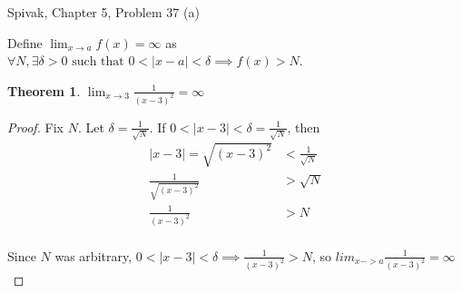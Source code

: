 \documentclass{article} %
\theoremstyle{plain}
\newtheorem*{theorem*}{Theorem}
\theoremstyle{definition}
\begin{document}
\noindent{} Spivak, Chapter 5, Problem 37 (a) 

Define $\lim_{x \to a} f(x) = \infty$ as $\forall N, \exists \delta > 0 \text{ such that } 0 < |x-a| < \delta \implies f(x) > N$.

\begin{theorem*}
    $\lim_{x \to 3} \frac{1}{(x-3)^2} = \infty$
\end{theorem*}

\begin{proof} 
    Fix $N$.  Let $\delta = \frac{1}{\sqrt{N}}$.  If $0 < |x-3| < \delta = \frac{1}{\sqrt{N}}$, then
    \begin{align*}
        |x - 3| = \sqrt{(x-3)^2} & < \frac{1}{\sqrt{N}} \\
        \frac{1}{\sqrt{(x-3)^2}} & > \sqrt{N} \\
        \frac{1}{(x-3)^2} & > N \\
    \end{align*}

    Since $N$ was arbitrary, $0 < |x-3| < \delta \implies \frac{1}{(x-3)^2} > N$, so $lim_{x->a} \frac{1}{(x-3)^2} = \infty$
\end{proof} 





    





    
    
\end{document}
